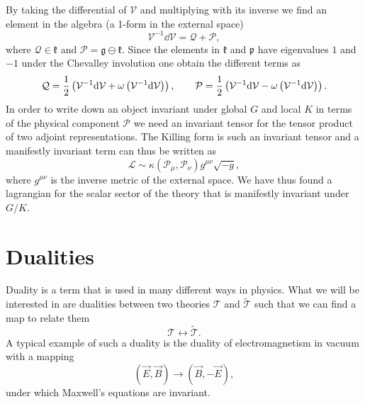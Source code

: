 By taking the differential of $\mathcal{V}$ and multiplying with its inverse we find an element in the algebra (a 1-form in the external space)
\begin{equation}
    \mathcal{V}^{-1}\dd \mathcal{V} = \mathcal{Q}+\mathcal{P},
\end{equation}
where $\mathcal{Q}\in\mathfrak{k}$ and $\mathcal{P}=\mathfrak{g}\ominus\mathfrak{k}$. Since the elements in $\mathfrak{k}$ and $\mathfrak{p}$ have eigenvalues $1$ and $-1$ under the Chevalley involution one obtain the different terms as
\begin{equation}
    \mathcal{Q} = \frac{1}{2}\left(\mathcal{V}^{-1}\mathrm{d} \mathcal{V}+\omega\left(\mathcal{V}^{-1}\mathrm{d} \mathcal{V}\right)\right),\\\qquad \mathcal{P} = \frac{1}{2}\left(\mathcal{V}^{-1}\mathrm{d} \mathcal{V}-\omega\left(\mathcal{V}^{-1}\mathrm{d} \mathcal{V}\right)\right).
\end{equation}
In order to write down an object invariant under global $G$ and local $K$ in terms of the physical component $\mathcal{P}$ we need an invariant tensor for the tensor product of two adjoint representations. The Killing form is such an invariant tensor and a manifestly invariant term can thus be written as 
\begin{equation}
    \mathcal{L} \sim \kappa(\mathcal{P}_\mu,\mathcal{P}_\nu)g^{\mu\nu}\sqrt{-g},
\end{equation}
where $g^{\mu\nu}$ is the inverse metric of the external space. We have thus found a lagrangian for the scalar sector of the theory that is manifestly invariant under $G/K$. 


\section{Dualities}\label{sec:Dualities}
Duality is a term that is used in many different ways in physics. What we will be interested in are dualities between two theories $\mathscr{T}$ and $\tilde{\mathscr{T}}$ such that we can find a map to relate them 
\begin{equation}
    \mathscr{T} \leftrightarrow \mathscr{\tilde{T}}.
\end{equation}
A typical example of such a duality is the duality of electromagnetism in vacuum with a mapping 
\begin{equation}
    \left(\vec{E},\vec{B}\right) \to \left(\vec{B},-\vec{E}\right),
\end{equation}
under which Maxwell's equations are invariant. 

